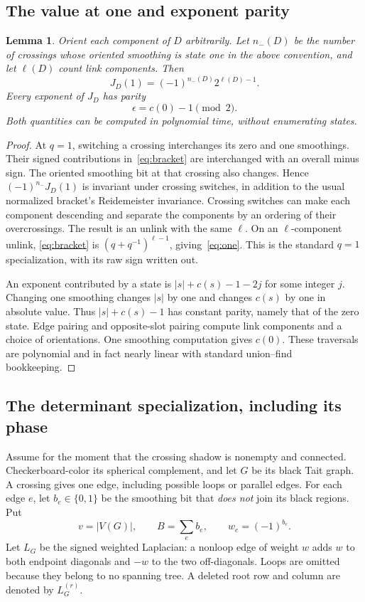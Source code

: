 \documentclass[11pt]{article}
\newtheorem{lemma}[theorem]{Lemma}
\theoremstyle{definition}
\theoremstyle{remark}
\begin{document}
\subsection{The value at one and exponent parity}
\begin{lemma}\label{lem:one}
Orient each component of $D$ arbitrarily. Let $n_-(D)$ be the number of
crossings whose oriented smoothing is state one in the above convention,
and let $\ell(D)$ count link components. Then
\begin{equation}\label{eq:one}
 J_D(1)=(-1)^{n_-(D)}2^{\ell(D)-1}.
\end{equation}
Every exponent of $J_D$ has parity
\begin{equation}\label{eq:parity}
 \epsilon=c(0)-1\pmod2.
\end{equation}
Both quantities can be computed in polynomial time, without enumerating
states.
\end{lemma}
\begin{proof}
At $q=1$, switching a crossing interchanges its zero and one smoothings.
Their signed contributions in~\eqref{eq:bracket} are interchanged with an
overall minus sign. The oriented smoothing bit at that crossing also
changes. Hence $(-1)^{n_-}J_D(1)$ is invariant under crossing switches, in
addition to the usual normalized bracket's Reidemeister invariance.
Crossing switches can make each component descending and separate the
components by an ordering of their overcrossings. The result is an unlink
with the same $\ell$. On an $\ell$-component unlink,
\eqref{eq:bracket} is $(q+q^{-1})^{\ell-1}$, giving~\eqref{eq:one}.
This is the standard $q=1$ specialization, with its raw sign written out.

An exponent contributed by a state is $|s|+c(s)-1-2j$ for some integer $j$.
Changing one smoothing changes $|s|$ by one and changes $c(s)$ by one in
absolute value. Thus $|s|+c(s)-1$ has constant parity, namely that of the
zero state. Edge pairing and opposite-slot pairing compute link components
and a choice of orientations. One smoothing computation gives $c(0)$.
These traversals are polynomial and in fact nearly linear with standard
union--find bookkeeping.
\end{proof}

\subsection{The determinant specialization, including its phase}
Assume for the moment that the crossing shadow is nonempty and connected.
Checkerboard-color its spherical complement, and let $G$ be its black Tait
graph. A crossing gives one edge, including possible loops or parallel
edges. For each edge $e$, let $b_e\in\{0,1\}$ be the smoothing bit that
\emph{does not} join its black regions. Put
\[
 v=|V(G)|,\qquad B=\sum_e b_e,\qquad w_e=(-1)^{b_e}.
\]
Let $L_G$ be the signed weighted Laplacian: a nonloop edge of weight $w$
adds $w$ to both endpoint diagonals and $-w$ to the two off-diagonals. Loops
are omitted because they belong to no spanning tree. A deleted root row and
column are denoted by $L_G^{(r)}$.
\end{document}
